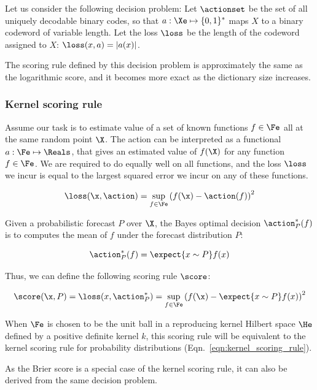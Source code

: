 Let us consider the following decision problem: Let $\actionset$ be the set of all uniquely decodable binary codes, so that $a:\Xe\mapsto\{0,1\}^{*}$ maps $X$ to a binary codeword of variable length. Let the loss $\loss$ be the length of the codeword assigned to $X$: $\loss(x,a) = \vert a(x)\vert$.

The scoring rule defined by this decision problem is approximately the same as the logarithmic score, and it becomes more exact as the dictionary size increases.

\subsubsection{Kernel scoring rule}

Assume our task is to estimate value of a set of known functions $f\in{\Fe}$ all at the same random point $\X$. The action can be interpreted as a functional $a:\Fe\mapsto\Reals$, that gives an estimated value of $f(\X)$ for any function $f\in\Fe$. We are required to do equally well on all functions, and the loss $\loss$ we incur is equal to the largest squared error we incur on any of these functions.

\begin{equation}
	\loss(\x, \action) = \sup_{f\in\Fe}\left( f(\x) - \action(f)\right)^2
\end{equation}

Given a probabilistic forecast $P$ over $\X$, the Bayes optimal decision $\action^{*}_{P}(f)$ is to computes the mean of $f$ under the forecast distribution $P$:

\begin{equation}
	\action^{*}_{P}(f) = \expect{x\sim P} f(x)
\end{equation}

Thus, we can define the following scoring rule $\score$:

\begin{equation}
	\score(\x,P) = \loss(x,\action^{*}_{P} )
		= 	\sup_{f\in\Fe}\left( f(\x) - \expect{x\sim P} f(x) \right)^2
\end{equation}

When $\Fe$ is chosen to be the unit ball in a reproducing kernel Hilbert space $\He$ defined by a positive definite kernel $k$, this scoring rule will be equivalent to the kernel scoring rule for probability distributions (Eqn.\ \eqref{eqn:kernel_scoring_rule}).

As the Brier score is a special case of the kernel scoring rule, it can also be derived from the same decision problem.

